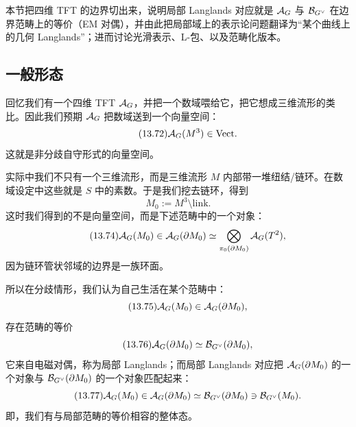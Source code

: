 \begin{sectionkey}
本节把四维 TFT 的边界切出来，说明局部 Langlands 对应就是 $\mathcal{A}_G$ 与 $\mathcal{B}_{G^\vee}$ 在边界范畴上的等价（EM 对偶），并由此把局部域上的表示论问题翻译为“某个曲线上的几何 Langlands”；进而讨论光滑表示、L-包、以及范畴化版本。
\end{sectionkey}

\subsection{一般形态}\label{sec:13-6-1}

回忆我们有一个四维 TFT $\mathcal{A}_G$，并把一个数域喂给它，把它想成三维流形的类比。因此我们预期 $\mathcal{A}_G$ 把数域送到一个向量空间：
\begin{equation}\tag{13.72}
\mathcal{A}_G(M^3)\in\mathrm{Vect}.
\end{equation}
这就是非分歧自守形式的向量空间。

实际中我们不只有一个三维流形，而是三维流形 $M$ 内部带一堆纽结/链环。在数域设定中这些就是 $S$ 中的素数。于是我们挖去链环，得到
\begin{equation}\tag{13.73}
M_0:=M^3\setminus\mathrm{link}.
\end{equation}
这时我们得到的不是向量空间，而是下述范畴中的一个对象：
\begin{equation}\tag{13.74}
\mathcal{A}_G(M_0)\in\mathcal{A}_G(\partial M_0)\simeq\bigotimes_{\pi_0(\partial M_0)}\mathcal{A}_G(T^2),
\end{equation}
因为链环管状邻域的边界是一族环面。

所以在分歧情形，我们认为自己生活在某个范畴中：
\begin{equation}\tag{13.75}
\mathcal{A}_G(M_0)\in\mathcal{A}_G(\partial M_0),
\end{equation}
存在范畴的等价
\begin{equation}\tag{13.76}
\mathcal{A}_G(\partial M_0)\simeq\mathcal{B}_{G^\vee}(\partial M_0),
\end{equation}
它来自电磁对偶，称为局部 Langlands；而局部 Langlands 对应把 $\mathcal{A}_G(\partial M_0)$ 的一个对象与 $\mathcal{B}_{G^\vee}(\partial M_0)$ 的一个对象匹配起来：
\begin{equation}\tag{13.77}
\mathcal{A}_G(M_0)\in\mathcal{A}_G(\partial M_0)\simeq\mathcal{B}_{G^\vee}(\partial M_0)\ni\mathcal{B}_{G^\vee}(M_0).
\end{equation}
即，我们有与局部范畴的等价相容的整体态。

